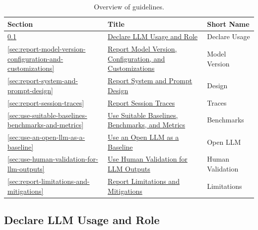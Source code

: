 \documentclass[smallextended]{svjour3}
\begin{document}
\begin{table}[tb]
\centering
\caption{Overview of guidelines.}
\label{tab:guidelines}
\begin{tabular}{@{}lll@{}}
\toprule
\textbf{Section} & \textbf{Title} & \textbf{Short Name} \\
\midrule
\ref*{sec:declare-llm-usage-and-role}                            & \hyperref[sec:declare-llm-usage-and-role]{Declare LLM Usage and Role}                                          & Declare Usage    \\
\ref*{sec:report-model-version-configuration-and-customizations} & \hyperref[sec:report-model-version-configuration-and-customizations]{Report Model Version, Configuration, and Customizations} & Model Version    \\
\ref*{sec:report-system-and-prompt-design}                       & \hyperref[sec:report-system-and-prompt-design]{Report System and Prompt Design}                                & Design           \\
\ref*{sec:report-session-traces}                                 & \hyperref[sec:report-session-traces]{Report Session Traces}                                                    & Traces           \\
\ref*{sec:use-suitable-baselines-benchmarks-and-metrics}         & \hyperref[sec:use-suitable-baselines-benchmarks-and-metrics]{Use Suitable Baselines, Benchmarks, and Metrics}  & Benchmarks       \\
\ref*{sec:use-an-open-llm-as-a-baseline}                         & \hyperref[sec:use-an-open-llm-as-a-baseline]{Use an Open LLM as a Baseline}                                    & Open LLM         \\
\ref*{sec:use-human-validation-for-llm-outputs}                  & \hyperref[sec:use-human-validation-for-llm-outputs]{Use Human Validation for LLM Outputs}                      & Human Validation \\
\ref*{sec:report-limitations-and-mitigations}                    & \hyperref[sec:report-limitations-and-mitigations]{Report Limitations and Mitigations}                          & Limitations      \\
\bottomrule
\end{tabular}
\end{table}

\subsection{Declare LLM Usage and Role}
\label{sec:declare-llm-usage-and-role}
\end{document}

